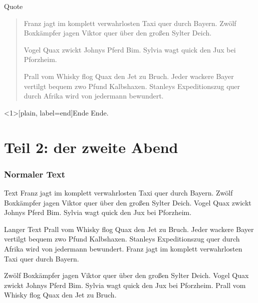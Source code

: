 	\begin{frame}{Quote}
		\begin{quote}
			Franz jagt im komplett verwahrlosten Taxi quer durch Bayern.
			Zwölf Boxkämpfer jagen Viktor quer über den großen Sylter Deich.

			Vogel Quax zwickt Johnys Pferd Bim.
			Sylvia wagt quick den Jux bei Pforzheim.

			Prall vom Whisky flog Quax den Jet zu Bruch.
			Jeder wackere Bayer vertilgt bequem zwo Pfund Kalbshaxen.
			Stanleys Expeditionszug quer durch Afrika wird von jedermann bewundert.
		\end{quote}
	\end{frame}


	\begin{frame}[plain, label=end]{Ende}
		\Huge{Ende.}
	\end{frame}









	\part{Teil 2: der zweite Abend}

	\frame{\partpage}

	\section{Normaler Text}

	\begin{frame}{Text}
		Franz jagt im komplett verwahrlosten Taxi quer durch Bayern.
		Zwölf Boxkämpfer jagen Viktor quer über den großen Sylter Deich.
		Vogel Quax zwickt Johnys Pferd Bim.
		Sylvia wagt quick den Jux bei Pforzheim.
	\end{frame}


	\begin{frame}{Langer Text}
		Prall vom Whisky flog Quax den Jet zu Bruch.
		Jeder wackere Bayer vertilgt bequem zwo Pfund Kalbshaxen.
		Stanleys Expeditionszug quer durch Afrika wird von jedermann bewundert.
		Franz jagt im komplett verwahrlosten Taxi quer durch Bayern.

		Zwölf Boxkämpfer jagen Viktor quer über den großen Sylter Deich.
		Vogel Quax zwickt Johnys Pferd Bim.
		Sylvia wagt quick den Jux bei Pforzheim.
		Prall vom Whisky flog Quax den Jet zu Bruch.
	\end{frame}


